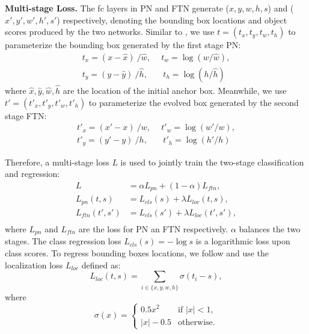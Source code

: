 \documentclass[5pt]{article}
\begin{document}
\vspace{0.08in}
\noindent\textbf{Multi-stage Loss.}
The fc layers in PN and FTN generate ($x, y, w, h, s$) and ($x', y', w', h', s'$) respectively, denoting the bounding box locations and object scores produced by the two networks. Similar to \cite{girshick2014rich}, we use $t = (t_x, t_y, t_w, t_h)$ to parameterize the bounding box generated by the first stage PN:
\begin{equation}
\begin{split}
  t_x = (x - \hat x) ~/ \hat w, & ~~ t_w = \log (w/\hat w), \\
  t_y = (y - \hat y) ~/ \hat h, & ~~~ t_h = \log (h/\hat h)
\end{split}
\end{equation}
where $\hat x, \hat y, \hat w, \hat h$ are the location of the initial anchor box. Meanwhile, we use $t' = (t'_x, t'_y, t'_w, t'_h)$ to parameterize the evolved box generated by the second stage FTN:
\begin{equation}
\begin{split}
  t'_x = (x' - x) ~/ w, & ~~ t'_w = \log (w'/w),  \\
  t'_y = (y' - y) ~/ h, & ~~~ t'_h = \log (h'/h)
\end{split}
\end{equation}

Therefore, a multi-stage loss $L$ is used to jointly train the two-stage classification and regression:
\begin{equation}
\begin{split}
L & = \alpha L_{pn} + (1 - \alpha)L_{ftn}, \\
L_{pn}(t, s) & = L_{cls}(s) + \lambda L_{loc}(t, s), \\
L_{ftn}(t', s') & = L_{cls}(s') + \lambda L_{loc}(t', s'), \\
\end{split}
\label{affineTransform}
\end{equation}
where $L_{pn}$ and $L_{ftn}$ are the loss for PN an FTN respectively. ${\alpha}$ balances the two stages. The class regression loss $L_{cls}(s) = -\log s$ is a logarithmic loss upon class scores. To regress bounding boxes locations, we follow \cite{girshickICCV15fastrcnn} and use the localization loss $L_{loc}$ defined as:
\begin{equation}
  L_{loc}(t, s) = \sum_{i \in \{x, y, w, h\}} \sigma(t_i - s),
\end{equation}
where
\begin{equation}
\sigma(x)=\left\{
\begin{array}{ll}
0.5x^2 & \text{if~} |x| < 1,\\
|x| - 0.5 & \text{otherwise.}
\end{array} \right.
\end{equation}
\end{document}
